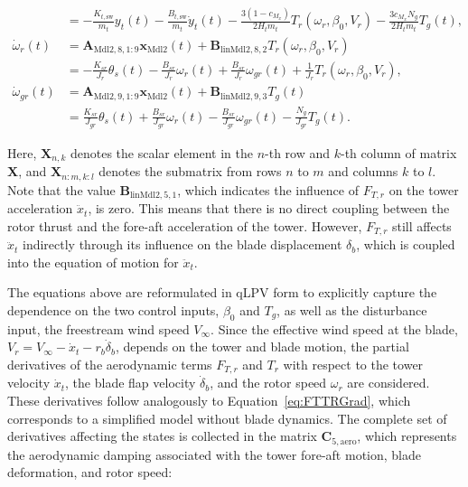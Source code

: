 {\begin{align*}
            &= -\frac{K_{t,\text{sw}}}{m_t} y_t(t) - \frac{B_{t,\text{sw}}}{m_t} \dot{y}_t(t)
            - \frac{3(1-c_{M_x})}{2 H_t m_t} T_r(\omega_r, \beta_0, V_r)
            - \frac{3 c_{M_x} N_g}{2 H_t m_t} T_g(t), \\[1ex]
            \dot{\omega}_r(t) &= \bm{A}_{\text{Mdl2}, 8, 1:9} \bm{x}_{\text{Mdl2}}(t) + \bm{B}_{\text{linMdl2}, 8, 2} T_r(\omega_r, \beta_0, V_r) \\
            &= -\frac{K_{sr}}{J_r} \theta_s(t) - \frac{B_{sr}}{J_r} \omega_r(t) + \frac{B_{sr}}{J_r} \omega_{gr}(t)
            + \frac{1}{J_r} T_r(\omega_r, \beta_0, V_r), \\[1ex]
            \dot{\omega}_{gr}(t) &= \bm{A}_{\text{Mdl2}, 9, 1:9} \bm{x}_{\text{Mdl2}}(t) + \bm{B}_{\text{linMdl2}, 9, 3} T_g(t) \\
            &= \frac{K_{sr}}{J_{gr}} \theta_s(t) + \frac{B_{sr}}{J_{gr}} \omega_r(t) - \frac{B_{sr}}{J_{gr}} \omega_{gr}(t)
            - \frac{N_g}{J_{gr}} T_g(t).
    \end{align*}}
    {
        Here, \(\bm{X}_{n,k}\) denotes the scalar element in the $n$-th row and $k$-th column of matrix \(\bm{X}\), and \(\bm{X}_{n:m, k:l}\) denotes the submatrix from rows \(n\) to \(m\) and columns \(k\) to \(l\). Note that the value $\bm{B}_{\text{linMdl2}, 5, 1}$, which indicates the influence of $F_{T,r}$ on the tower acceleration $\ddot{x}_t$, is zero. This means that there is no direct coupling between the rotor thrust and the fore-aft acceleration of the tower. However, $F_{T,r}$ still affects $\ddot{x}_t$ indirectly through its influence on the blade displacement $\delta_b$, which is coupled into the equation of motion for $\ddot{x}_t$.
        
        The equations above are reformulated in qLPV form to explicitly capture the dependence on the two control inputs, \(\beta_0\) and \(T_g\), as well as the disturbance input, the freestream wind speed \(V_\infty\). Since the effective wind speed at the blade, \(V_r = V_\infty - \dot{x}_t - r_b\dot{\delta}_b\), depends on the tower and blade motion, the partial derivatives of the aerodynamic terms \(F_{T,r}\) and \(T_r\) with respect to the tower velocity \(\dot{x}_t\), the blade flap velocity \(\dot{\delta}_b\), and the rotor speed \(\omega_r\) are considered. These derivatives follow analogously to Equation~\eqref{eq:FTTRGrad}, which corresponds to a simplified model without blade dynamics. The complete set of derivatives affecting the states is collected in the matrix \(\mathbf{C}_{5,\text{aero}}\), which represents the aerodynamic damping associated with the tower fore-aft motion, blade deformation, and rotor speed:}
